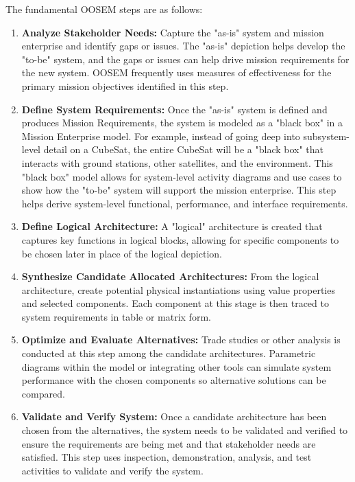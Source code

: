 The fundamental OOSEM steps are as follows:
\begin{enumerate}
\item{\textbf{Analyze Stakeholder Needs:} Capture the "as-is" system and mission enterprise and identify gaps or issues. The "as-is" depiction helps develop the "to-be" system, and the gaps or issues can help drive mission requirements for the new system. OOSEM frequently uses measures of effectiveness for the primary mission objectives identified in this step.}
\item{\textbf{Define System Requirements:} Once the "as-is" system is defined and produces Mission Requirements, the system is modeled as a "black box" in a Mission Enterprise model. For example, instead of going deep into subsystem-level detail on a CubeSat, the entire CubeSat will be a "black box" that interacts with ground stations, other satellites, and the environment. This "black box" model allows for system-level activity diagrams and use cases to show how the "to-be" system will support the mission enterprise. This step helps derive system-level functional, performance, and interface requirements.}
\item{\textbf{Define Logical Architecture:} A "logical" architecture is created that captures key functions in logical blocks, allowing for specific components to be chosen later in place of the logical depiction.}
\item{\textbf{Synthesize Candidate Allocated Architectures:} From the logical architecture, create potential physical instantiations using value properties and selected components. Each component at this stage is then traced to system requirements in table or matrix form.}
\item{\textbf{Optimize and Evaluate Alternatives:} Trade studies or other analysis is conducted at this step among the candidate architectures. Parametric diagrams within the model or integrating other tools can simulate system performance with the chosen components so alternative solutions can be compared.}
\item{\textbf{Validate and Verify System:} Once a candidate architecture has been chosen from the alternatives, the system needs to be validated and verified to ensure the requirements are being met and that stakeholder needs are satisfied. This step uses inspection, demonstration, analysis, and test activities to validate and verify the system.}
\end{enumerate}

